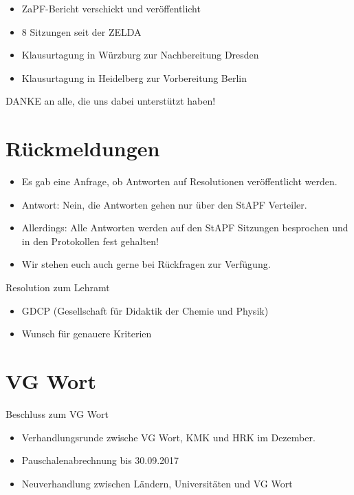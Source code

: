 \documentclass[compress, aspectratio=169]{beamer}
\begin{document}
\begin{frame}
  \begin{itemize}
    \item ZaPF-Bericht verschickt und veröffentlicht
    \item 8 Sitzungen seit der ZELDA
    \item Klausurtagung in Würzburg zur Nachbereitung Dresden
    \item Klausurtagung in Heidelberg zur Vorbereitung Berlin
    \end{itemize}
    \vspace{5mm}
    \begin{center}
      \Large DANKE an alle, die uns dabei unterstützt haben!
    \end{center}
\end{frame}

\section{Rückmeldungen}

\begin{frame}
  \begin{itemize}
    \item Es gab eine Anfrage, ob Antworten auf Resolutionen veröffentlicht werden.
    \item Antwort: Nein, die Antworten gehen nur über den StAPF Verteiler.
    \item Allerdings: Alle Antworten werden auf den StAPF Sitzungen besprochen und in den Protokollen fest gehalten!
    \item Wir stehen euch auch gerne bei Rückfragen zur Verfügung.
  \end{itemize}
\end{frame}

\begin{frame}{Resolution zum Lehramt}
  \begin{itemize}
  \item GDCP (Gesellschaft für Didaktik der Chemie und Physik) 
  \item Wunsch für genauere Kriterien
  \end{itemize}
\end{frame}

\section{VG Wort}

\begin{frame}{Beschluss zum VG Wort}
  \begin{itemize}
  \item Verhandlungsrunde zwische VG Wort, KMK und HRK im Dezember.
  \item Pauschalenabrechnung bis 30.09.2017
  \item Neuverhandlung zwischen Ländern, Universitäten und VG Wort
  \end{itemize}
\end{frame}
\end{document}
